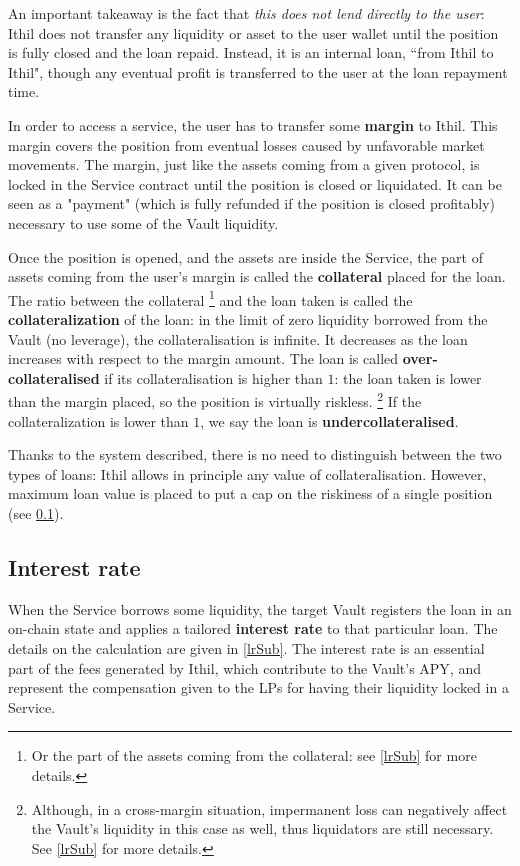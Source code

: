 \documentclass[a4paper,10 pt]{article}
\theoremstyle{definition}
\begin{document}
An important takeaway is the fact that {\it this does not lend directly to the user}: Ithil does not transfer any liquidity or asset to the user wallet until the position is fully closed and the loan repaid. Instead, it is an internal loan, ``from Ithil to Ithil", though any eventual profit is transferred to the user at the loan repayment time.

In order to access a service, the user has to transfer some {\bf margin} to Ithil. This margin covers the position from eventual losses caused by unfavorable market movements. The margin, just like the assets coming from a given protocol, is locked in the Service contract until the position is closed or liquidated. It can be seen as a "payment" (which is fully refunded if the position is closed profitably) necessary to use some of the Vault liquidity.

Once the position is opened, and the assets are inside the Service, the part of assets coming from the user's margin is called the {\bf collateral} placed for the loan. The ratio between the collateral \footnote{Or the part of the assets coming from the collateral: see \ref{lrSub} for more details.} and the loan taken is called the {\bf collateralization} of the loan: in the limit of zero liquidity borrowed from the Vault (no leverage), the collateralisation is infinite. It decreases as the loan increases with respect to the margin amount. The loan is called {\bf over-collateralised} if its collateralisation is higher than $1$: the loan taken is lower than the margin placed, so the position is virtually riskless. \footnote{Although, in a cross-margin situation, impermanent loss can negatively affect the Vault's liquidity in this case as well, thus liquidators are still necessary. See \ref{lrSub} for more details.} If the collateralization is lower than $1$, we say the loan is {\bf undercollateralised}. 

Thanks to the system described, there is no need to distinguish between the two types of loans: Ithil allows in principle any value of collateralisation. However, maximum loan value is placed to put a cap on the riskiness of a single position (see \ref{irSub}).

\subsection{Interest rate}\label{irSub}
When the Service borrows some liquidity, the target Vault registers the loan in an on-chain state and applies a tailored {\bf interest rate} to that particular loan. The details on the calculation are given in \ref{lrSub}. The interest rate is an essential part of the fees generated by Ithil, which contribute to the Vault's APY, and represent the compensation given to the LPs for having their liquidity locked in a Service.
\end{document}

